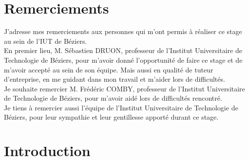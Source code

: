 \documentclass[12pt, french]{report}
\begin{document}
\section*{Remerciements}
J'adresse mes remerciements aux personnes qui m'ont permis à réaliser ce stage au sein de l'IUT de Béziers.\\

En premier lieu, M. Sébastien DRUON, professeur de l'Institut Universitaire de Technologie de Béziers, pour m'avoir donné l'opportunité de faire ce stage et de m'avoir accepté au sein de son équipe. Mais aussi en qualité de tuteur d'entreprise, en me guidant dans mon travail et m'aider lors de difficultés.\\

Je souhaite remercier M. Frédéric COMBY, professeur de l'Institut Universitaire de Technologie de Béziers, pour m'avoir aidé lors de difficultés rencontré.\\

Je tiens à remercier aussi l'équipe de l'Institut Universitaire de Technologie de Béziers, pour leur sympathie et leur gentillesse apporté durant ce stage.\\

\newpage

\renewcommand{\thepage}{}
\tableofcontents
\clearpage 


\startcontents[mainsections]%

\newpage
\renewcommand{\thepage}{\arabic{page}}
\setcounter{page}{1}

\section{Introduction}
\setcounter{page}{1} 
\end{document}
